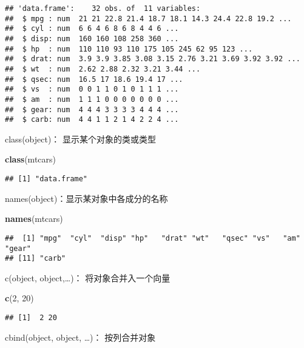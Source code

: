 \documentclass[]{book}
\newenvironment{Shaded}{\begin{snugshade}}{\end{snugshade}}
\newcommand{\DecValTok}[1]{\textcolor[rgb]{0.00,0.00,0.81}{#1}}
\newcommand{\KeywordTok}[1]{\textcolor[rgb]{0.13,0.29,0.53}{\textbf{#1}}}
\newcommand{\NormalTok}[1]{#1}
\begin{document}
\begin{verbatim}
## 'data.frame':    32 obs. of  11 variables:
##  $ mpg : num  21 21 22.8 21.4 18.7 18.1 14.3 24.4 22.8 19.2 ...
##  $ cyl : num  6 6 4 6 8 6 8 4 4 6 ...
##  $ disp: num  160 160 108 258 360 ...
##  $ hp  : num  110 110 93 110 175 105 245 62 95 123 ...
##  $ drat: num  3.9 3.9 3.85 3.08 3.15 2.76 3.21 3.69 3.92 3.92 ...
##  $ wt  : num  2.62 2.88 2.32 3.21 3.44 ...
##  $ qsec: num  16.5 17 18.6 19.4 17 ...
##  $ vs  : num  0 0 1 1 0 1 0 1 1 1 ...
##  $ am  : num  1 1 1 0 0 0 0 0 0 0 ...
##  $ gear: num  4 4 4 3 3 3 3 4 4 4 ...
##  $ carb: num  4 4 1 1 2 1 4 2 2 4 ...
\end{verbatim}

class(object)： 显示某个对象的类或类型

\begin{Shaded}
\begin{Highlighting}[]
\KeywordTok{class}\NormalTok{(mtcars)}
\end{Highlighting}
\end{Shaded}

\begin{verbatim}
## [1] "data.frame"
\end{verbatim}

names(object)：显示某对象中各成分的名称

\begin{Shaded}
\begin{Highlighting}[]
\KeywordTok{names}\NormalTok{(mtcars)}
\end{Highlighting}
\end{Shaded}

\begin{verbatim}
##  [1] "mpg"  "cyl"  "disp" "hp"   "drat" "wt"   "qsec" "vs"   "am"   "gear"
## [11] "carb"
\end{verbatim}

c(object, object,\ldots{})： 将对象合并入一个向量

\begin{Shaded}
\begin{Highlighting}[]
\KeywordTok{c}\NormalTok{(}\DecValTok{2}\NormalTok{, }\DecValTok{20}\NormalTok{)}
\end{Highlighting}
\end{Shaded}

\begin{verbatim}
## [1]  2 20
\end{verbatim}

cbind(object, object, \ldots{})： 按列合并对象
\end{document}
